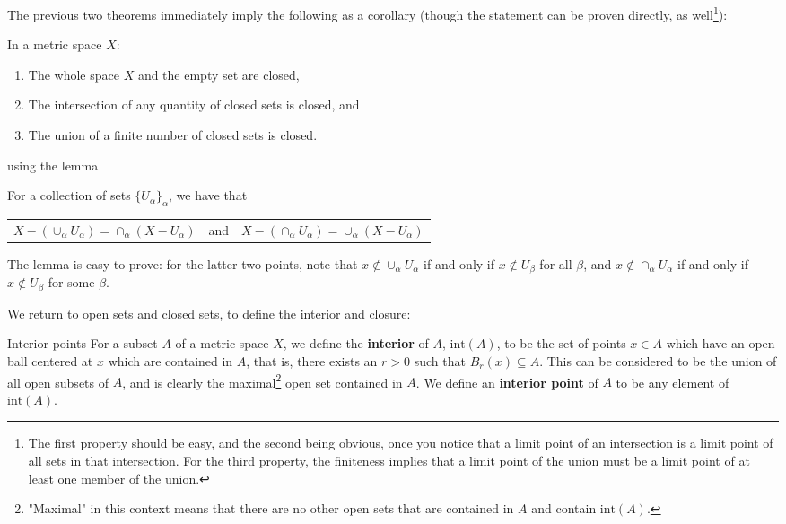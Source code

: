 The previous two theorems immediately imply the following as a corollary (though the statement can be proven directly, as well\footnote{The first property should be easy, and the second being obvious, once you notice that a limit point of an intersection is a limit point of all sets in that intersection. For the third property, the finiteness implies that a limit point of the union must be a limit point of at least one member of the union.}):
\begin{bprop}{}{} 
In a metric space $X$:
\begin{enumerate}
    \item The whole space $X$ and the empty set are closed,
    \item The intersection of any quantity of closed sets is closed, and
    \item The union of a finite number of closed sets is closed.
\end{enumerate}
\end{bprop}
using the lemma
\begin{blemma}{}{}
For a collection of sets $\{U_{\alpha} \}_{\alpha}$, we have that
\begin{table}[H]
    \centering
    \begin{tabular}{ccc}
         $X - \left( \cup_{\alpha} U_{\alpha} \right) = \cap_{\alpha} (X - U_{\alpha})$ & and & $X - \left( \cap_{\alpha} U_{\alpha} \right) = \cup_{\alpha} (X - U_{\alpha})$ \\
    \end{tabular}
\end{table}
\end{blemma}
The lemma is easy to prove: for the latter two points, note that $x \not\in \cup_{\alpha} U_{\alpha}$ if and only if $x \not\in U_{\beta}$ for all $\beta$, and $x \not\in \cap_{\alpha} U_{\alpha}$ if and only if $x \not\in U_{\beta}$ for some $\beta$.

We return to open sets and closed sets, to define the interior and closure:

\begin{bdefin}{Interior points}{}
For a subset $A$ of a metric space $X$, we define the \textbf{interior} of $A$, $\text{int}(A)$, to be the set of points $x\in A$ which have an open ball centered at $x$ which are contained in $A$, that is, there exists an $r >0$ such that $B_{r}(x)\subseteq A$. This can be considered to be the union of all open subsets of $A$, and is clearly the maximal\footnote{"Maximal" in this context means that there are no other open sets that are contained in $A$ and contain $\text{int}(A)$.} open set contained in $A$.
We define an \textbf{interior point} of $A$ to be any element of $\text{int}(A)$.
\end{bdefin}

